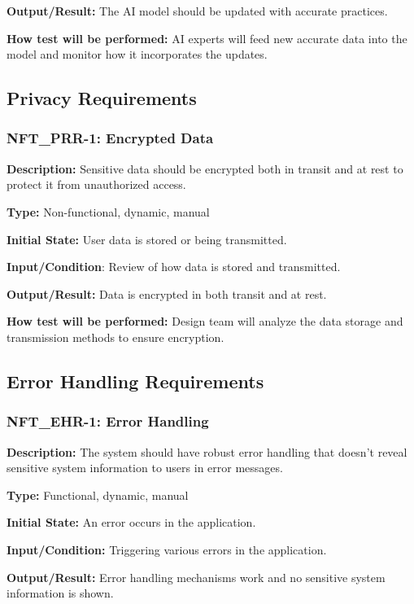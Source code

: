 \documentclass[12pt, titlepage]{article}
\begin{document}
\textbf{Output/Result:} The AI model should be updated with accurate practices.

\textbf{How test will be performed:} AI experts will feed new accurate data into the model and monitor how it incorporates the updates.
\newline
\subsection{Privacy Requirements}


\subsubsection*{\textbf{NFT\_PRR-1: Encrypted Data}
}

\textbf{Description: }Sensitive data should be encrypted both in transit and at rest to protect it from unauthorized access.

\textbf{Type: }Non-functional, dynamic, manual

\textbf{Initial State: }User data is stored or being transmitted.

\textbf{Input/Condition}: Review of how data is stored and transmitted.

\textbf{Output/Result: }Data is encrypted in both transit and at rest.

\textbf{How test will be performed:} Design team will analyze the data storage and transmission methods to ensure encryption.
\newline
\subsection{Error Handling Requirements}


\subsubsection*{\textbf{NFT\_EHR-1: Error Handling}}


\textbf{Description: }The system should have robust error handling that doesn’t reveal sensitive system information to users in error messages.

\textbf{Type:} Functional, dynamic, manual

\textbf{Initial State:} An error occurs in the application.

\textbf{Input/Condition:} Triggering various errors in the application.

\textbf{Output/Result: }Error handling mechanisms work and no sensitive system information is shown.
\end{document}
